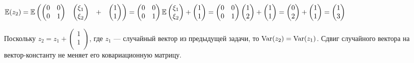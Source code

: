 \begin{problem}
\begin{sol}
$\mathbb{E} (z_2) = \mathbb{E}   \begin{pmatrix}
 \begin{pmatrix}
0 & 0 \\
0 & 1 \\
\end{pmatrix}  &  \begin{pmatrix}
\xi_1 \\
\xi_2 \\
\end{pmatrix}  & + &  \begin{pmatrix}
1\\
1\\
\end{pmatrix}  \\
\end{pmatrix}  =  \begin{pmatrix}
0 & 0 \\
0 & 1 \\
\end{pmatrix}  \mathbb{E}   \begin{pmatrix}
\xi_1 \\
\xi_2 \\
\end{pmatrix}  +  \begin{pmatrix}
1\\
1\\
\end{pmatrix}  =  \begin{pmatrix}
0 & 0 \\
0 & 1 \\
\end{pmatrix}   \begin{pmatrix}
1\\
2\\
\end{pmatrix}  +  \begin{pmatrix}
1\\
1\\
\end{pmatrix}  =  \begin{pmatrix}
0\\
2\\
\end{pmatrix} +  \begin{pmatrix}
1\\
1\\
\end{pmatrix}  =  \begin{pmatrix}
1\\
3\\
\end{pmatrix} $

Поскольку $z_2 = z_1 +  \begin{pmatrix}
1\\
1\\
\end{pmatrix} $, где $z_1$ — случайный вектор из предыдущей задачи, то $\operatorname{Var} (z_2) = \operatorname{Var} (z_1)$. Сдвиг случайного вектора на вектор-константу не меняет его ковариационную матрицу.
\end{sol}
\end{problem}
